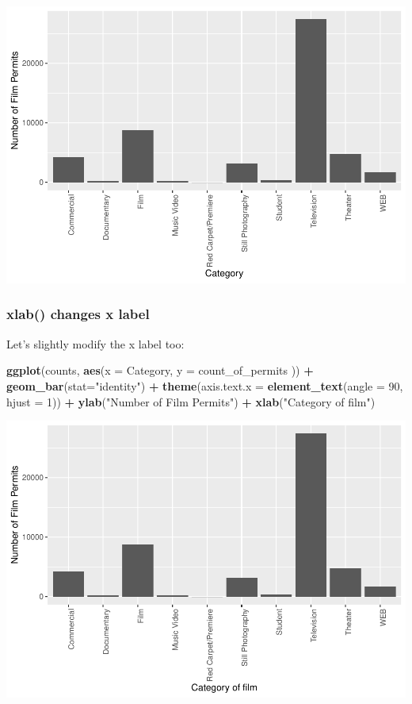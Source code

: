 \documentclass[]{book}
\newenvironment{Shaded}{\begin{snugshade}}{\end{snugshade}}
\newcommand{\KeywordTok}[1]{\textcolor[rgb]{0.13,0.29,0.53}{\textbf{#1}}}
\newcommand{\DataTypeTok}[1]{\textcolor[rgb]{0.13,0.29,0.53}{#1}}
\newcommand{\DecValTok}[1]{\textcolor[rgb]{0.00,0.00,0.81}{#1}}
\newcommand{\StringTok}[1]{\textcolor[rgb]{0.31,0.60,0.02}{#1}}
\newcommand{\OperatorTok}[1]{\textcolor[rgb]{0.81,0.36,0.00}{\textbf{#1}}}
\newcommand{\NormalTok}[1]{#1}
\begin{document}
\includegraphics{Statistics_Lab_files/figure-latex/1categoryC-1.pdf}

\subsubsection{xlab() changes x label}\label{xlab-changes-x-label}

Let's slightly modify the x label too:

\begin{Shaded}
\begin{Highlighting}[]
\KeywordTok{ggplot}\NormalTok{(counts, }\KeywordTok{aes}\NormalTok{(}\DataTypeTok{x =}\NormalTok{ Category, }\DataTypeTok{y =}\NormalTok{ count_of_permits )) }\OperatorTok{+}
\StringTok{  }\KeywordTok{geom_bar}\NormalTok{(}\DataTypeTok{stat=}\StringTok{"identity"}\NormalTok{) }\OperatorTok{+}\StringTok{ }
\StringTok{  }\KeywordTok{theme}\NormalTok{(}\DataTypeTok{axis.text.x =} \KeywordTok{element_text}\NormalTok{(}\DataTypeTok{angle =} \DecValTok{90}\NormalTok{, }\DataTypeTok{hjust =} \DecValTok{1}\NormalTok{)) }\OperatorTok{+}
\StringTok{  }\KeywordTok{ylab}\NormalTok{(}\StringTok{"Number of Film Permits"}\NormalTok{) }\OperatorTok{+}\StringTok{ }
\StringTok{  }\KeywordTok{xlab}\NormalTok{(}\StringTok{"Category of film"}\NormalTok{)}
\end{Highlighting}
\end{Shaded}

\includegraphics{Statistics_Lab_files/figure-latex/1categoryD-1.pdf}
\end{document}

